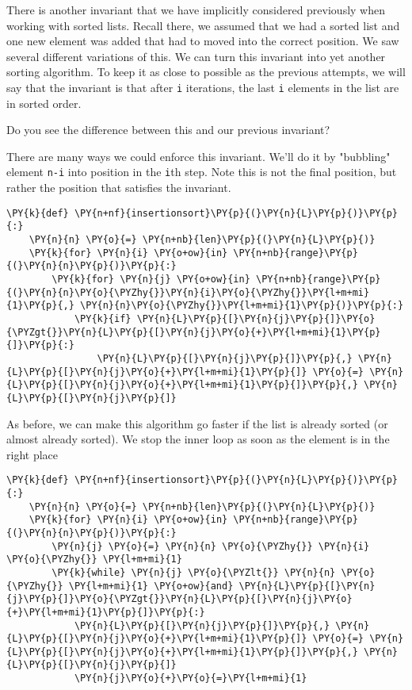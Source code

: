 There is another invariant that we have implicitly considered previously when working with sorted lists.  Recall there, we assumed that we had a sorted list and one new element was added that had to moved into the correct position.  We saw several different variations of this.  We can turn this invariant into yet another sorting algorithm.  To keep it as close to possible as the previous attempts, we will say that the invariant is that after \texttt{i} iterations, the last \texttt{i} elements in the list are in sorted order.  


Do you see the difference between this and our previous invariant?


There are many ways we could enforce this invariant.  We'll do it by "bubbling" element \texttt{n-i} into position in the \texttt{i}th step.  Note this is not the final position, but rather the position that satisfies the invariant.

\begin{Verbatim}[commandchars=\\\{\}]
\PY{k}{def} \PY{n+nf}{insertionsort}\PY{p}{(}\PY{n}{L}\PY{p}{)}\PY{p}{:}
    \PY{n}{n} \PY{o}{=} \PY{n+nb}{len}\PY{p}{(}\PY{n}{L}\PY{p}{)}
    \PY{k}{for} \PY{n}{i} \PY{o+ow}{in} \PY{n+nb}{range}\PY{p}{(}\PY{n}{n}\PY{p}{)}\PY{p}{:}
        \PY{k}{for} \PY{n}{j} \PY{o+ow}{in} \PY{n+nb}{range}\PY{p}{(}\PY{n}{n}\PY{o}{\PYZhy{}}\PY{n}{i}\PY{o}{\PYZhy{}}\PY{l+m+mi}{1}\PY{p}{,} \PY{n}{n}\PY{o}{\PYZhy{}}\PY{l+m+mi}{1}\PY{p}{)}\PY{p}{:}
            \PY{k}{if} \PY{n}{L}\PY{p}{[}\PY{n}{j}\PY{p}{]}\PY{o}{\PYZgt{}}\PY{n}{L}\PY{p}{[}\PY{n}{j}\PY{o}{+}\PY{l+m+mi}{1}\PY{p}{]}\PY{p}{:}
                \PY{n}{L}\PY{p}{[}\PY{n}{j}\PY{p}{]}\PY{p}{,} \PY{n}{L}\PY{p}{[}\PY{n}{j}\PY{o}{+}\PY{l+m+mi}{1}\PY{p}{]} \PY{o}{=} \PY{n}{L}\PY{p}{[}\PY{n}{j}\PY{o}{+}\PY{l+m+mi}{1}\PY{p}{]}\PY{p}{,} \PY{n}{L}\PY{p}{[}\PY{n}{j}\PY{p}{]}
\end{Verbatim}



As before, we can make this algorithm go faster if the list is already sorted (or almost already sorted).  We stop the inner loop as soon as the element is in the right place

\begin{Verbatim}[commandchars=\\\{\}]
\PY{k}{def} \PY{n+nf}{insertionsort}\PY{p}{(}\PY{n}{L}\PY{p}{)}\PY{p}{:}
    \PY{n}{n} \PY{o}{=} \PY{n+nb}{len}\PY{p}{(}\PY{n}{L}\PY{p}{)}
    \PY{k}{for} \PY{n}{i} \PY{o+ow}{in} \PY{n+nb}{range}\PY{p}{(}\PY{n}{n}\PY{p}{)}\PY{p}{:}
        \PY{n}{j} \PY{o}{=} \PY{n}{n} \PY{o}{\PYZhy{}} \PY{n}{i} \PY{o}{\PYZhy{}} \PY{l+m+mi}{1}
        \PY{k}{while} \PY{n}{j} \PY{o}{\PYZlt{}} \PY{n}{n} \PY{o}{\PYZhy{}} \PY{l+m+mi}{1} \PY{o+ow}{and} \PY{n}{L}\PY{p}{[}\PY{n}{j}\PY{p}{]}\PY{o}{\PYZgt{}}\PY{n}{L}\PY{p}{[}\PY{n}{j}\PY{o}{+}\PY{l+m+mi}{1}\PY{p}{]}\PY{p}{:}
            \PY{n}{L}\PY{p}{[}\PY{n}{j}\PY{p}{]}\PY{p}{,} \PY{n}{L}\PY{p}{[}\PY{n}{j}\PY{o}{+}\PY{l+m+mi}{1}\PY{p}{]} \PY{o}{=} \PY{n}{L}\PY{p}{[}\PY{n}{j}\PY{o}{+}\PY{l+m+mi}{1}\PY{p}{]}\PY{p}{,} \PY{n}{L}\PY{p}{[}\PY{n}{j}\PY{p}{]}
            \PY{n}{j}\PY{o}{+}\PY{o}{=}\PY{l+m+mi}{1}
\end{Verbatim}



